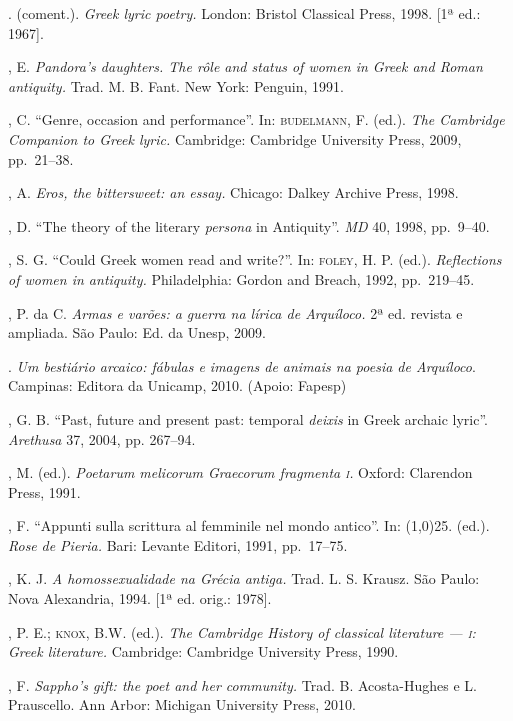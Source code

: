 \begin{bibliohedra}
\titidem. (coment.). \textit{Greek lyric poetry.} London: Bristol
Classical Press, 1998. [1ª ed.: 1967]. 

, E. \textit{Pandora’s daughters. The rôle and status of
women in Greek and Roman antiquity.} Trad. M. B. Fant. New York: Penguin, 1991.

, C. “Genre, occasion and performance”. In:
\textsc{budelmann}, F. (ed.). \textit{The Cambridge Companion to Greek
lyric.} Cambridge: Cambridge University Press, 2009, pp.~21--38.

, A. \textit{Eros, the bittersweet: an essay.} Chicago:
Dalkey Archive Press, 1998.

, D. “The theory of the literary \textit{persona} in Antiquity”.
\textit{MD} 40, 1998, pp.~9--40.

, S. G. “Could Greek women read and write?”. In: \textsc{foley}, H.
P. (ed.). \textit{Reflections of women in antiquity.} Philadelphia: Gordon and
Breach, 1992, pp.~219--45.

, P. da C. \textit{Armas e varões: a guerra na
lírica de Arquíloco.} 2ª ed. revista e ampliada. São Paulo: Ed. da Unesp, 2009.

\titidem. \textit{Um bestiário arcaico: fábulas e imagens
de animais na poesia de Arquíloco}. Campinas: Editora da Unicamp, 2010. (Apoio:
Fapesp)

, G. B. “Past, future and present past: temporal
\textit{deixis} in Greek archaic lyric”. \textit{Arethusa} 37, 2004, pp.
267--94.

, M. (ed.). \textit{Poetarum melicorum Graecorum fragmenta \textsc{i}.}
Oxford: Clarendon Press, 1991.

, F. “Appunti sulla scrittura al femminile nel mondo antico''.
In: \line(1,0){25}. (ed.). \textit{Rose} \textit{de Pieria.} Bari: Levante Editori,
1991, pp.~17--75.

, K. J.  \textit{A homossexualidade na Grécia antiga.}
Trad. L. S. Krausz. São Paulo: Nova Alexandria, 1994. [1ª ed. orig.: 1978].

, P. E.; \textsc{knox}, B.W. (ed.). \textit{The Cambridge History of
classical literature --- \textsc{i}: Greek literature.} Cambridge: Cambridge University
Press, 1990.

, F. \textit{Sappho’s gift: the poet and her community.} Trad.
B. Acosta-Hughes e L. Prauscello. Ann Arbor: Michigan University Press, 2010.


\end{bibliohedra}
